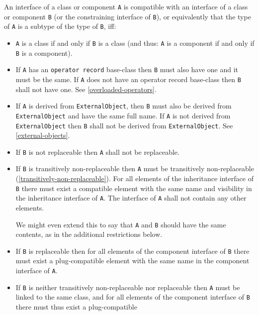 An interface of a class or component \lstinline!A! is compatible with an interface
of a class or component \lstinline!B! (or the constraining interface of \lstinline!B!), or
equivalently that the type of \lstinline!A! is a subtype of the type of \lstinline!B!, iff:
\begin{itemize}
\item
  \lstinline!A! is a class if and only if \lstinline!B! is a class (and thus: \lstinline!A! is a component
  if and only if \lstinline!B! is a component).
\item
  If \lstinline!A! has an \lstinline!operator record! base-class then \lstinline!B! must also have one and
  it must be the same. If \lstinline!A! does not have an operator record base-class
  then \lstinline!B! shall not have one. See \cref{overloaded-operators}.
\item
  If \lstinline!A! is derived from \lstinline!ExternalObject!, then \lstinline!B! must also be derived from
  \lstinline!ExternalObject! and have the same full name. If \lstinline!A! is not derived from
  \lstinline!ExternalObject! then \lstinline!B! shall not be derived from \lstinline!ExternalObject!. See
  \cref{external-objects}.
\item
  If \lstinline!B! is not replaceable then \lstinline!A! shall not be replaceable.
\item
  If \lstinline!B! is transitively non-replaceable then \lstinline!A! must be transitively
  non-replaceable (\cref{transitively-non-replaceable}). For all elements of the inheritance
  interface of \lstinline!B! there must exist a compatible element with the same
  name and visibility in the inheritance interface of \lstinline!A!. The interface
  of \lstinline!A! shall not contain any other elements.
  \begin{nonnormative}
  We might even extend this to say that \lstinline!A! and \lstinline!B! should have the same contents, as in the additional restrictions below.
  \end{nonnormative}
\item
  If \lstinline!B! is replaceable then for all elements of the component interface
  of \lstinline!B! there must exist a plug-compatible element with the same name in
  the component interface of \lstinline!A!.
\item
  If \lstinline!B! is neither transitively non-replaceable nor replaceable then \lstinline!A!
  must be linked to the same class, and for all elements of the
  component interface of \lstinline!B! there must thus exist a plug-compatible

\end{itemize}
